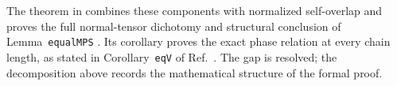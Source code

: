 \documentclass{article}
\begin{document}
The theorem
 in
 combines these components
with normalized self-overlap and proves the full normal-tensor dichotomy and
structural conclusion of Lemma~\texttt{equalMPS}
\cite{Cirac2016MPDO_arXiv}. Its corollary
 proves the exact phase
relation at every chain length, as stated in
Corollary~\texttt{eqV} of Ref.~\cite{Cirac2016MPDO_arXiv}. The gap is
resolved; the decomposition above records the mathematical structure of the
formal proof.



\end{document}
